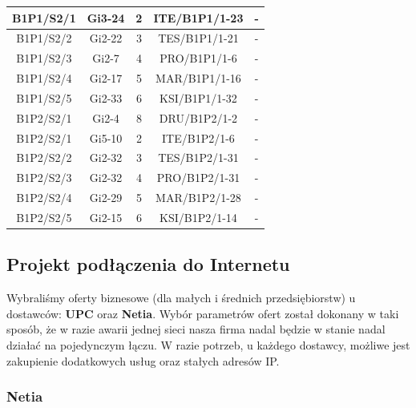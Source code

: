 \documentclass[a4paper,12pt]{extarticle}  %
\begin{document}
\begin{longtable}[c]{|c|c|c|c|c|}
	B1P1/S2/1 & Gi3-24  & 2 & ITE/B1P1/1-23 & -           \\ \hline %
	B1P1/S2/2 & Gi2-22  & 3 & TES/B1P1/1-21 & -           \\ \hline %
	B1P1/S2/3 & Gi2-7   & 4 & PRO/B1P1/1-6  & -           \\ \hline %
	B1P1/S2/4 & Gi2-17  & 5 & MAR/B1P1/1-16 & -           \\ \hline %
	B1P1/S2/5 & Gi2-33  & 6 & KSI/B1P1/1-32 & -           \\ \hline %
	B1P2/S2/1 & Gi2-4   & 8 & DRU/B1P2/1-2  & -           \\ \hline %
	B1P2/S2/1 & Gi5-10  & 2 & ITE/B1P2/1-6  & -           \\ \hline %
	B1P2/S2/2 & Gi2-32  & 3 & TES/B1P2/1-31 & -           \\ \hline %
	B1P2/S2/3 & Gi2-32  & 4 & PRO/B1P2/1-31 & -           \\ \hline %
	B1P2/S2/4 & Gi2-29  & 5 & MAR/B1P2/1-28 & -           \\ \hline %
	B1P2/S2/5 & Gi2-15  & 6 & KSI/B1P2/1-14 & -           \\ \hline %
\end{longtable}

\subsection{Projekt podłączenia do Internetu}

Wybraliśmy oferty biznesowe (dla małych i średnich przedsiębiorstw) u dostawców:
\textbf{UPC} oraz \textbf{Netia}.
Wybór parametrów ofert został dokonany w taki sposób, że w razie awarii jednej sieci nasza firma nadal
będzie w stanie nadal działać na pojedynczym łączu.
W razie potrzeb, u każdego dostawcy, możliwe jest zakupienie dodatkowych usług oraz stałych adresów IP.

\subsubsection{Netia}
\begin{figure}[H]
	\centering
\end{figure}
\end{document}
